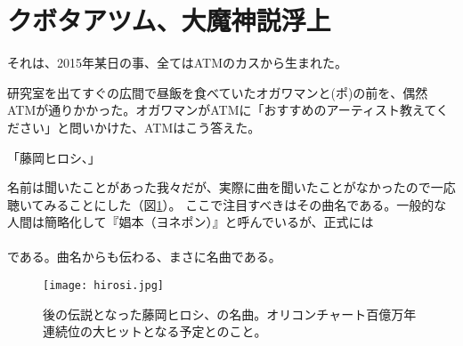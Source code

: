 \section{クボタアツム、大魔神説浮上}
それは、2015年某日の事、全てはATMのカスから生まれた。\par
研究室を出てすぐの広間で昼飯を食べていたオガワマンと(ポ)の前を、偶然ATMが通りかかった。オガワマンがATMに「おすすめのアーティスト教えてください」と問いかけた、ATMはこう答えた。
 \begin{center}
   「藤岡ヒロシ、」
 \end{center}
名前は聞いたことがあった我々だが、実際に曲を聞いたことがなかったので一応聴いてみることにした（図\ref{hirosi}）。
ここで注目すべきはその曲名である。一般的な人間は簡略化して『娼本（ヨネポン）』と呼んでいるが、正式には \\

\\

である。曲名からも伝わる、まさに名曲である。\par

\begin{figure}[H]
\centering
\texttt{[image: hirosi.jpg]}
\caption{後の伝説となった藤岡ヒロシ、の名曲。オリコンチャート百億万年連続位の大ヒットとなる予定とのこと。}
\label{hirosi}
\end{figure}

